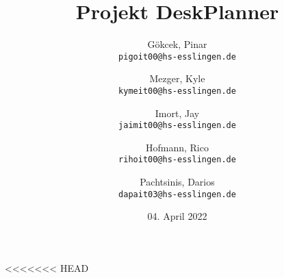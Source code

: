 \documentclass{article}
\title{Projekt DeskPlanner}
\author{
Gökcek, Pinar\\
\texttt{pigoit00@hs-esslingen.de}
\and
Mezger, Kyle\\
\texttt{kymeit00@hs-esslingen.de}
\and
Imort, Jay\\
\texttt{jaimit00@hs-esslingen.de}
\and
Hofmann, Rico\\
\texttt{rihoit00@hs-esslingen.de}
\and
Pachtsinis, Darios\\
\texttt{dapait03@hs-esslingen.de}
}
\date{04. April 2022}
\begin{document}
\begin{titlepage}
    \centering
    \maketitle

    \thispagestyle{empty}

    \vfill

\end{titlepage}

\tableofcontents

\pagebreak

% 




<<<<<<< HEAD
\end{document}
